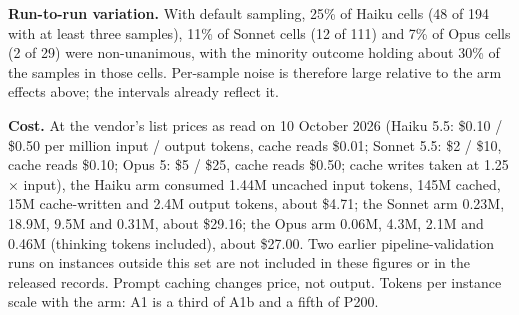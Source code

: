 \documentclass[10pt]{article}
\begin{document}
\begin{table}[t]
\centering\small
{}
\caption{Change in $\Delta$-pass when A1 is padded to the stated load (positive = padding helped), excluding instances the model solved from task text alone. $n$ is the number of instances with that arm built.}
\label{tab:curve}
\end{table}

\textbf{Run-to-run variation.} With default sampling, 25\% of Haiku cells (48 of 194 with at least three samples), 11\% of Sonnet cells (12 of 111) and 7\% of Opus cells (2 of 29) were non-unanimous, with the minority outcome holding about 30\% of the samples in those cells. Per-sample noise is therefore large relative to the arm effects above; the intervals already reflect it.

\textbf{Cost.} At the vendor's list prices as read on 10 October 2026 (Haiku 5.5: \$0.10 / \$0.50 per million input / output tokens, cache reads \$0.01; Sonnet 5.5: \$2 / \$10, cache reads \$0.10; Opus 5: \$5 / \$25, cache reads \$0.50; cache writes taken at 1.25$\times$ input), the Haiku arm consumed 1.44M uncached input tokens, 145M cached, 15M cache-written and 2.4M output tokens, about \$4.71; the Sonnet arm 0.23M, 18.9M, 9.5M and 0.31M, about \$29.16; the Opus arm 0.06M, 4.3M, 2.1M and 0.46M (thinking tokens included), about \$27.00. Two earlier pipeline-validation runs on instances outside this set are not included in these figures or in the released records. Prompt caching changes price, not output. Tokens per instance scale with the arm: A1 is a third of A1b and a fifth of P200.
\end{document}
